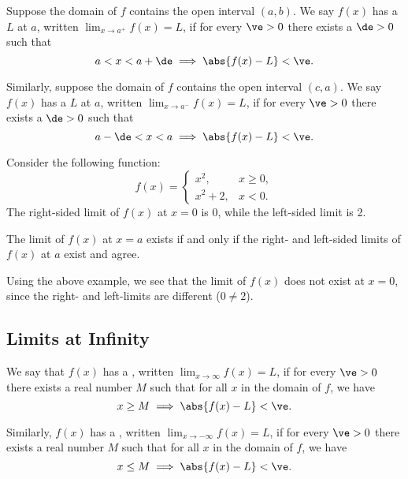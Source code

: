 \begin{definition}
    Suppose the domain of $f$ contains the open interval $(a, b)$. We say $f(x)$ has a  $L$ at $a$, written $\displaystyle\lim_{x \to a^+} f(x) = L$, if for every $\ve > 0$ there exists a $\de > 0$ such that \[a < x < a + \de \implies \abs{f(x) - L} < \ve.\]

    Similarly, suppose the domain of $f$ contains the open interval $(c, a)$. We say $f(x)$ has a  $L$ at $a$, written $\displaystyle\lim_{x \to a^-} f(x) = L$, if for every $\ve > 0$ there exists a $\de > 0$ such that \[a - \de < x < a \implies \abs{f(x) - L} < \ve.\]
\end{definition}

\begin{example}
    Consider the following function: \[f(x) = \begin{cases}x^2, & x \geq 0,\\ x^2 + 2, & x < 0.\end{cases}\] The right-sided limit of $f(x)$ at $x = 0$ is 0, while the left-sided limit is 2.
\end{example}

\begin{proposition}
    The limit of $f(x)$ at $x = a$ exists if and only if the right- and left-sided limits of $f(x)$ at $a$ exist and agree.
\end{proposition}

Using the above example, we see that the limit of $f(x)$ does not exist at $x = 0$, since the right- and left-limits are different ($0 \neq 2$).

\subsection{Limits at Infinity}

\begin{definition}
    We say that $f(x)$ has a , written $\displaystyle\lim_{x \to \infty} f(x) = L$, if for every $\ve > 0$ there exists a real number $M$ such that for all $x$ in the domain of $f$, we have \[x \geq M \implies \abs{f(x) - L} < \ve.\]
    
    Similarly, $f(x)$ has a , written $\displaystyle\lim_{x \to -\infty} f(x) = L$, if for every $\ve > 0$ there exists a real number $M$ such that for all $x$ in the domain of $f$, we have \[x \leq M \implies \abs{f(x) - L} < \ve.\]
\end{definition}

